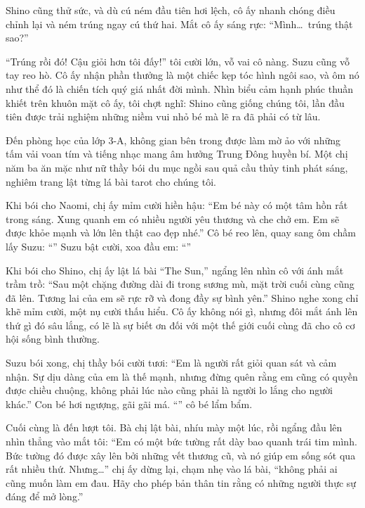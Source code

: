 \documentclass[../main.tex]{subfiles}
\begin{document}
Shino cũng thử sức, và dù cú ném đầu tiên hơi lệch, cô ấy nhanh chóng điều chỉnh lại và ném trúng ngay cú thứ hai. Mắt cô ấy sáng rực: ``Mình\dots\ trúng thật sao?''

``Trúng rồi đó! Cậu giỏi hơn tôi đấy!'' tôi cười lớn, vỗ vai cô nàng. Suzu cũng vỗ tay reo hò. Cô ấy nhận phần thưởng là một chiếc kẹp tóc hình ngôi sao, và ôm nó như thể đó là chiến tích quý giá nhất đời mình. Nhìn biểu cảm hạnh phúc thuần khiết trên khuôn mặt cô ấy, tôi chợt nghĩ: Shino cũng giống chúng tôi, lần đầu tiên được trải nghiệm những niềm vui nhỏ bé mà lẽ ra đã phải có từ lâu.

Đến phòng học của lớp 3-A, không gian bên trong được làm mờ ảo với những tấm vải voan tím và tiếng nhạc mang âm hưởng Trung Đông huyền bí. Một chị năm ba ăn mặc như nữ thầy bói du mục ngồi sau quả cầu thủy tinh phát sáng, nghiêm trang lật từng lá bài tarot cho chúng tôi.

Khi bói cho Naomi, chị ấy mỉm cười hiền hậu: ``Em bé này có một tâm hồn rất trong sáng. Xung quanh em có nhiều người yêu thương và che chở em. Em sẽ được khỏe mạnh và lớn lên thật cao đẹp nhé.'' Cô bé reo lên, quay sang ôm chầm lấy Suzu: ``'' Suzu bật cười, xoa đầu em: ``''

Khi bói cho Shino, chị ấy lật lá bài ``The Sun,'' ngẩng lên nhìn cô với ánh mắt trầm trồ: ``Sau một chặng đường dài đi trong sương mù, mặt trời cuối cùng cũng đã lên. Tương lai của em sẽ rực rỡ và đong đầy sự bình yên.'' Shino nghe xong chỉ khẽ mỉm cười, một nụ cười thấu hiểu. Cô ấy không nói gì, nhưng đôi mắt ánh lên thứ gì đó sâu lắng, có lẽ là sự biết ơn đối với một thế giới cuối cùng đã cho cô cơ hội sống bình thường.

Suzu bói xong, chị thầy bói cười tươi: ``Em là người rất giỏi quan sát và cảm nhận. Sự dịu dàng của em là thế mạnh, nhưng đừng quên rằng em cũng có quyền được chiều chuộng, không phải lúc nào cũng phải là người lo lắng cho người khác.'' Con bé hơi ngượng, gãi gãi má. ``'' cô bé lẩm bẩm.

Cuối cùng là đến lượt tôi. Bà chị lật bài, nhíu mày một lúc, rồi ngẩng đầu lên nhìn thẳng vào mắt tôi: ``Em có một bức tường rất dày bao quanh trái tim mình. Bức tường đó được xây lên bởi những vết thương cũ, và nó giúp em sống sót qua rất nhiều thứ. Nhưng\dots'' chị ấy dừng lại, chạm nhẹ vào lá bài, ``không phải ai cũng muốn làm em đau. Hãy cho phép bản thân tin rằng có những người thực sự đáng để mở lòng.''
\end{document}
